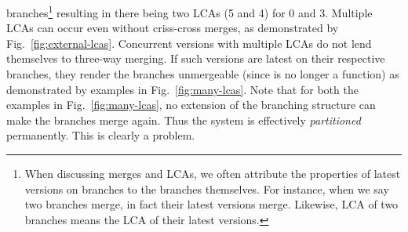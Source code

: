 branches\footnote{
  When discussing merges and LCAs, we often attribute the properties
  of latest versions on branches to the branches themselves.  For
  instance, when we say two branches merge, in fact their latest
  versions merge. Likewise, LCA of two branches means the LCA of their
  latest versions.
}
resulting in there being two LCAs (5 and 4) for 0 and 3.
Multiple LCAs can occur even without criss-cross merges, as
demonstrated by Fig.~\ref{fig:external-lcas}.
Concurrent versions with multiple LCAs do not lend themselves to
three-way merging. If such versions are latest on their respective
branches, they render the branches unmergeable (since   is no
longer a function) as demonstrated by examples in
Fig.~\ref{fig:many-lcas}. Note that for both the examples in
Fig.~\ref{fig:many-lcas}, no extension of the branching structure
can make the branches merge again. Thus the system is effectively
\emph{partitioned} permanently. This is clearly a problem.

